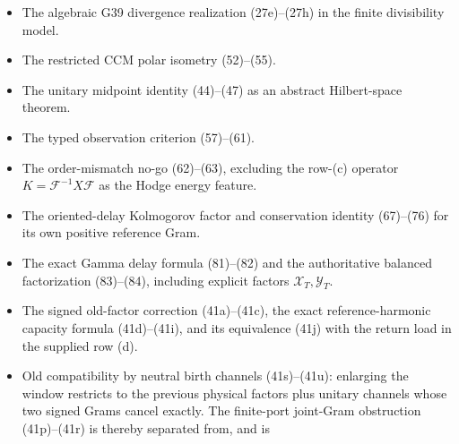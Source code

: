 \documentclass[11pt]{article}
\begin{document}
\begin{itemize}
      raw phase.  The Hadamard residue/finite-part graph must contribute a
      genuinely new boundary state; it cannot merely regularize the same
      two Tate coordinates.  Finally (688)--(691) complete the skew phase
      by its Abel exterior tails and prove that its full primitive Tate
      terminal is exactly zero: the boundary pole in (685) cancels between
      interior and exterior.  Hence neither the compressed skew phase nor
      its conservative full-line completion supplies the positive terminal.
      They can contribute only the skew/Kato part; the missing diagonal
      term must come from a genuinely Hermitian finite-part/residue metric
      state.  The diagonal test (692)--(694) makes this precise on the
      physical residue range: any realization which remains skew has zero
      diagonal in every \(\mathbb H_T\)-eigenvector, whereas the required
      metric has diagonal at least \(1/2\).  A valid Hadamard pullback must
      therefore create a nonzero Hermitian component and satisfy (694)
      without dividing by the eigenvalue.
\item The algebraic G39 divergence realization (27e)--(27h) in the finite
      divisibility model.
\item The restricted CCM polar isometry (52)--(55).
\item The unitary midpoint identity (44)--(47) as an abstract Hilbert-space
      theorem.
\item The typed observation criterion (57)--(61).
\item The order-mismatch no-go (62)--(63), excluding the row-(c) operator
      $K=\mathcal F^{-1}X\mathcal F$ as the Hodge energy feature.
\item The oriented-delay Kolmogorov factor and conservation identity
      (67)--(76) for its own positive reference Gram.
\item The exact Gamma delay formula (81)--(82) and the authoritative balanced
      factorization (83)--(84), including explicit factors
      $\mathcal X_T,\mathcal Y_T$.
\item The signed old-factor correction (41a)--(41c), the exact
      reference-harmonic capacity formula (41d)--(41i), and its equivalence
      (41j) with the return load in the supplied row (d).
\item Old compatibility by neutral birth channels (41s)--(41u): enlarging
      the window restricts to the previous physical factors plus unitary
      channels whose two signed Grams cancel exactly.  The finite-port
      joint-Gram obstruction (41p)--(41r) is thereby separated from, and is

\end{itemize}
\end{document}
